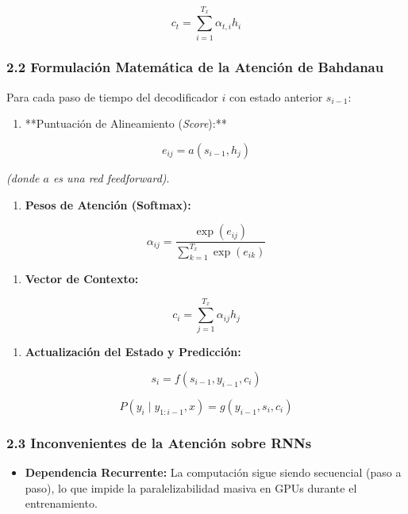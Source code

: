 \documentclass[11pt,oneside]{article}
\begin{document}
\[c_t = \sum_{i=1}^{T_x} \alpha_{t,i} h_i\]

\subsubsection{2.2 Formulación Matemática de la Atención de Bahdanau}

Para cada paso de tiempo del decodificador \(i\) con estado anterior \(s_{i-1}\):

\begin{enumerate}

\item **Puntuación de Alineamiento (\emph{Score}):**

\end{enumerate}

\[e_{ij} = a(s_{i-1}, h_j)\]

\emph{(donde \(a\) es una red feedforward)}.

\begin{enumerate}

\item \textbf{Pesos de Atención (Softmax):}

\end{enumerate}

\[\alpha_{ij} = \frac{\exp(e_{ij})}{\sum_{k=1}^{T_x} \exp(e_{ik})}\]

\begin{enumerate}

\item \textbf{Vector de Contexto:}

\end{enumerate}

\[c_i = \sum_{j=1}^{T_x} \alpha_{ij} h_j\]

\begin{enumerate}

\item \textbf{Actualización del Estado y Predicción:}

\end{enumerate}

\[s_i = f(s_{i-1}, y_{i-1}, c_i)\]

\[P(y_i \mid y_{1:i-1}, x) = g(y_{i-1}, s_i, c_i)\]

\subsubsection{2.3 Inconvenientes de la Atención sobre RNNs}

\begin{itemize}

\item \textbf{Dependencia Recurrente:} La computación sigue siendo secuencial (paso a paso), lo que impide la paralelizabilidad masiva en GPUs durante el entrenamiento.

\end{itemize}
\end{document}

